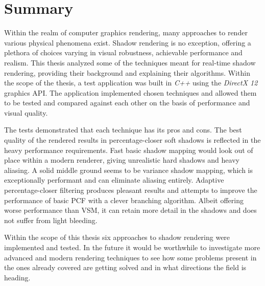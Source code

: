 \chapter{Summary}
\label{section:chapter_5}



Within the realm of computer graphics rendering, many approaches to render various physical phenomena exist. Shadow rendering is no exception, offering a plethora of choices varying in visual robustness, achievable performance and realism. This thesis analyzed some of the techniques meant for real-time shadow rendering, providing their background and explaining their algorithms. Within the scope of the thesis, a test application was built in \textit{C++} using the \textit{DirectX 12} graphics API. The application implemented chosen techniques and allowed them to be tested and compared against each other on the basis of performance and visual quality.

The tests demonstrated that each technique has its pros and cons. The best  quality of the rendered results in percentage-closer soft shadows is reflected in the heavy performance requirements. Fast basic shadow mapping would look out of place within a modern renderer, giving unrealistic hard shadows and heavy aliasing. A solid middle ground seems to be variance shadow mapping, which is exceptionally performant and can eliminate aliasing entirely. Adaptive percentage-closer filtering produces pleasant results and attempts to improve the performance of basic PCF with a clever branching algorithm. Albeit offering worse performance than VSM, it can retain more detail in the shadows and does not suffer from light bleeding.

Within the scope of this thesis six approaches to shadow rendering were implemented and tested. In the future it would be worthwhile to investigate more advanced and modern rendering techniques to see how some problems present in the ones already covered are getting solved and in what directions the field is heading.